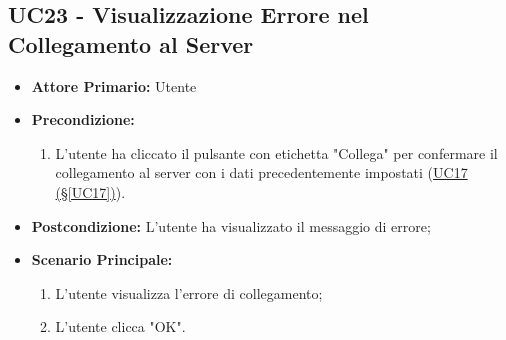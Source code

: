 \pagebreak

\subsection{UC23 - Visualizzazione Errore nel Collegamento al Server}\label{UC23}
\begin{itemize}
	\item \textbf{Attore Primario:}  Utente
	\item \textbf{Precondizione:} 
	\begin{enumerate}
		\item L'utente ha cliccato il pulsante con etichetta "Collega" per confermare il collegamento al server con i dati precedentemente impostati (\hyperref[UC17]{UC17 (§\ref*{UC17})}).
	\end{enumerate}	
	\item \textbf{Postcondizione:} L'utente ha visualizzato il messaggio di errore;
	\item \textbf{Scenario Principale:}
	\begin{enumerate}
		\item L'utente visualizza l'errore di collegamento;
		\item L'utente clicca "OK".
	\end{enumerate}
\end{itemize}

\pagebreak


